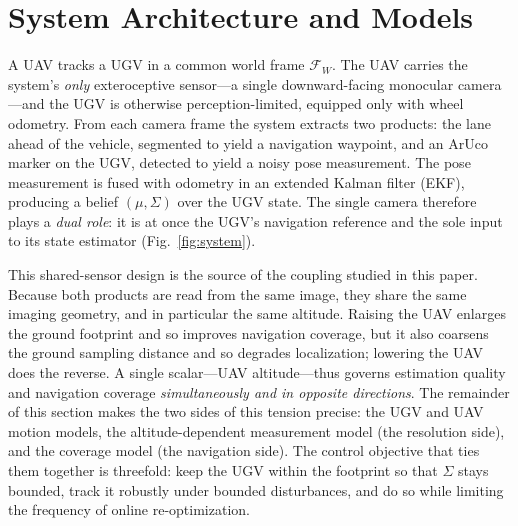 
\section{System Architecture and Models}
\label{sec:arch}

A UAV tracks a UGV in a common world frame $\mathcal{F}_W$. The UAV carries the
system's \emph{only} exteroceptive sensor---a single downward-facing monocular
camera---and the UGV is otherwise perception-limited, equipped only with wheel
odometry. From each camera frame the system extracts two products: the lane ahead of
the vehicle, segmented to yield a navigation waypoint, and an ArUco marker on the UGV,
detected to yield a noisy pose measurement. The pose measurement is fused with odometry
in an extended Kalman filter (EKF), producing a belief $(\mu,\Sigma)$ over the UGV
state. The single camera therefore plays a \emph{dual role}: it is at once the UGV's
navigation reference and the sole input to its state estimator (Fig.~\ref{fig:system}).

This shared-sensor design is the source of the coupling studied in this paper. Because
both products are read from the same image, they share the same imaging geometry, and
in particular the same altitude. Raising the UAV enlarges the ground footprint and so
improves navigation coverage, but it also coarsens the ground sampling distance and so
degrades localization; lowering the UAV does the reverse. A single scalar---UAV
altitude---thus governs estimation quality and navigation coverage \emph{simultaneously
and in opposite directions}. The remainder of this section makes the two sides of this
tension precise: the UGV and UAV motion models, the altitude-dependent measurement
model (the resolution side), and the coverage model (the navigation side). The control
objective that ties them together is threefold: keep the UGV within the footprint so
that $\Sigma$ stays bounded, track it robustly under bounded disturbances, and do so
while limiting the frequency of online re-optimization.

